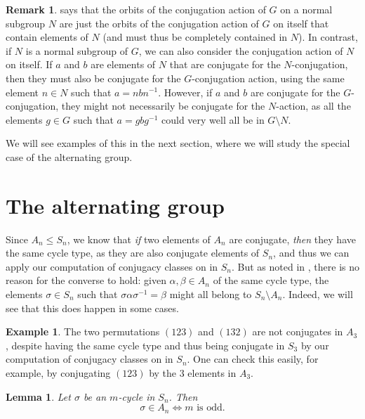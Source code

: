 \documentclass[12pt]{report}
\newtheorem{lemma}[theorem]{Lemma}
\numberwithin{equation}{section}
\numberwithin{theorem}{chapter}
\theoremstyle{definition}
\newtheorem{example}[theorem]{Example}
\newtheorem*{basic properties}{Basic Properties}
\newtheorem*{Important Remark}{Important Remark}
\newtheorem{remark}[theorem]{Remark}
\begin{document}
\begin{remark}\label{remark conjugation descending}	
 says that the orbits of the conjugation action of $G$ on a normal subgroup $N$ are just the orbits of the conjugation action of $G$ on itself that contain elements of $N$ (and must thus be completely contained in $N$). In contrast, if $N$ is a normal subgroup of $G$, we can also consider the conjugation action of $N$ on itself. If $a$ and $b$ are elements of $N$ that are conjugate for the $N$-conjugation, then they must also be conjugate for the $G$-conjugation action, using the same element $n \in N$ such that $a =nbn^{-1}$. However, if $a$ and $b$ are conjugate for the $G$-conjugation, they might not necessarily be conjugate for the $N$-action, as all the elements $g \in G$ such that $a = gbg^{-1}$ could very well all be in $G \setminus N$.
\end{remark}

We will see examples of this in the next section, where we will study the special case of the alternating group.


\section{The alternating group}



Since $A_n \leq S_n$, we know that {\em if} two elements of $A_n$ are conjugate, {\em then} they have the same cycle type, as they are also conjugate elements of $S_n$, and thus we can apply our computation of conjugacy classes on in $S_n$. But as noted in , there is no reason for the converse to hold: given $\alpha, \beta \in A_n$ of the same cycle type, the elements $\sigma \in S_n$ such that $\sigma \alpha \sigma^{-1} = \beta$ might all belong to $S_n \setminus A_n$. Indeed, we will see that this does happen in some cases.


\begin{example}
The two permutations $(123)$ and $(132)$ are not conjugates in $A_3$, despite having the same cycle type and thus being conjugate in $S_3$ by our computation of conjugacy classes on in $S_n$. One can check this easily, for example, by conjugating $(123)$ by the $3$ elements in $A_3$.
\end{example}



\begin{lemma}\label{cycle types in An}
Let $\sigma$ be an $m$-cycle in $S_n$. Then
$$\sigma \in A_n \iff m \textrm{ is odd}.$$
\end{lemma}
\end{document}

